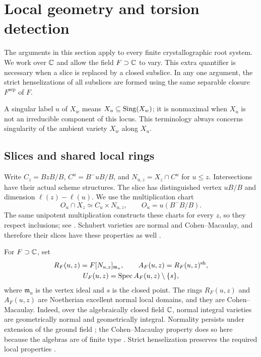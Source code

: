 \section{Local geometry and torsion detection}\label{tor:local}

The arguments in this section apply to every finite crystallographic root system. We work over $\mathbb C$ and allow the field $F\supset\mathbb C$ to vary. This extra quantifier is necessary when a slice is replaced by a closed subslice. In any one argument, the strict henselizations of all subslices are formed using the same separable closure $F^{\mathrm{sep}}$ of $F$.

A singular label $u$ of $X_w$ means $X_u\subseteq\operatorname{Sing}(X_w)$; it is nonmaximal when $X_u$ is not an irreducible component of this locus. This terminology always concerns singularity of the ambient variety $X_w$ along $X_u$.

\subsection{Slices and shared local rings}\label{tor:charts}
Write $C_z=BzB/B$, $C^u=B^-uB/B$, and $N_{u,z}=X_z\cap C^u$ for $u\le z$. Intersections have their actual scheme structures. The slice has distinguished vertex $uB/B$ and dimension $\ell(z)-\ell(u)$. We use the multiplication chart
\[
 O_u\cap X_z\simeq C_u\times N_{u,z},
 \qquad O_u=u(B^-B/B).
\]
The same unipotent multiplication constructs these charts for every $z$, so they respect inclusions; see \cite[Lemma~2.1 and its proof]{KWY13}. Schubert varieties are normal and Cohen--Macaulay, and therefore their slices have these properties as well \cite[Sections~2.1--2.2]{Bri05}.

For $F\supset\mathbb C$, set
\[
 \begin{gathered}
 R_F(u,z)=F[N_{u,z}]_{\mathfrak m_u},
 \qquad A_F(u,z)=R_F(u,z)^{\mathrm{sh}},\\
 U_F(u,z)=\operatorname{Spec} A_F(u,z)\setminus\{s\},
 \end{gathered}
\]
where $\mathfrak m_u$ is the vertex ideal and $s$ is the closed point. The rings $R_F(u,z)$ and $A_F(u,z)$ are Noetherian excellent normal local domains, and they are Cohen--Macaulay. Indeed, over the algebraically closed field $\mathbb C$, normal integral varieties are geometrically normal and geometrically integral. Normality persists under extension of the ground field \cite[Tags~038N and 038P]{The26}; the Cohen--Macaulay property does so here because the algebras are of finite type \cite[Tag~045P]{The26}. Strict henselization preserves the required local properties \cite[Tags~06DI and 06LM]{The26}.

